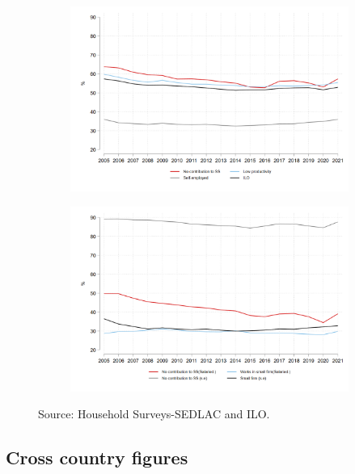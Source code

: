 \documentclass[english]{article}
\begin{document}
\begin{figure}[!htb]
\centering
  \caption{Evolution of alternative informality related measures}
\begin{subfigure}{.5\textwidth}
  \centering
  \includegraphics[width=1\linewidth]{latex/figures/Series/LAC_ipo_fig1.png}
  \label{fig:sub1}
\end{subfigure}%
\begin{subfigure}{.5\textwidth}
  \centering
  \includegraphics[width=1\linewidth]{latex/figures/Series/LAC_ipo_fig2.png}
  \label{fig:sub2}
\end{subfigure}
\label{fig:test}
\footnotesize{Source: Household Surveys-SEDLAC and ILO.}

\end{figure}


\subsection{Cross country figures}
\end{document}
